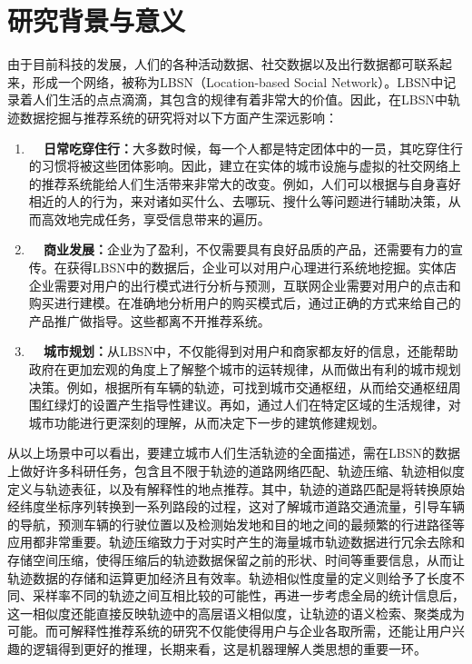 \section{研究背景与意义}
由于目前科技的发展，人们的各种活动数据、社交数据以及出行数据都可联系起来，形成一个网络，被称为LBSN（Location-based Social Network）。LBSN中记录着人们生活的点点滴滴，其包含的规律有着非常大的价值。因此，在LBSN中轨迹数据挖掘与推荐系统的研究将对以下方面产生深远影响：
\begin{enumerate}
    \item \textbf{~~日常吃穿住行：}大多数时候，每一个人都是特定团体中的一员，其吃穿住行的习惯将被这些团体影响。因此，建立在实体的城市设施与虚拟的社交网络上的推荐系统能给人们生活带来非常大的改变。例如，人们可以根据与自身喜好相近的人的行为，来对诸如买什么、去哪玩、搜什么等问题进行辅助决策，从而高效地完成任务，享受信息带来的遍历。
    \item \textbf{~~商业发展：}企业为了盈利，不仅需要具有良好品质的产品，还需要有力的宣传。在获得LBSN中的数据后，企业可以对用户心理进行系统地挖掘。实体店企业需要对用户的出行模式进行分析与预测，互联网企业需要对用户的点击和购买进行建模。在准确地分析用户的购买模式后，通过正确的方式来给自己的产品推广做指导。这些都离不开推荐系统。
    \item \textbf{~~城市规划：}从LBSN中，不仅能得到对用户和商家都友好的信息，还能帮助政府在更加宏观的角度上了解整个城市的运转规律，从而做出有利的城市规划决策。例如，根据所有车辆的轨迹，可找到城市交通枢纽，从而给交通枢纽周围红绿灯的设置产生指导性建议。再如，通过人们在特定区域的生活规律，对城市功能进行更深刻的理解，从而决定下一步的建筑修建规划。
\end{enumerate}

从以上场景中可以看出，要建立城市人们生活轨迹的全面描述，需在LBSN的数据上做好许多科研任务，包含且不限于轨迹的道路网络匹配、轨迹压缩、轨迹相似度定义与轨迹表征，以及有解释性的地点推荐。其中，轨迹的道路匹配是将转换原始经纬度坐标序列转换到一系列路段的过程，这对了解城市道路交通流量，引导车辆的导航，预测车辆的行驶位置以及检测始发地和目的地之间的最频繁的行进路径等应用都非常重要。轨迹压缩致力于对实时产生的海量城市轨迹数据进行冗余去除和存储空间压缩，使得压缩后的轨迹数据保留之前的形状、时间等重要信息，从而让轨迹数据的存储和运算更加经济且有效率。轨迹相似性度量的定义则给予了长度不同、采样率不同的轨迹之间互相比较的可能性，再进一步考虑全局的统计信息后，这一相似度还能直接反映轨迹中的高层语义相似度，让轨迹的语义检索、聚类成为可能。而可解释性推荐系统的研究不仅能使得用户与企业各取所需，还能让用户兴趣的逻辑得到更好的推理，长期来看，这是机器理解人类思想的重要一环。

